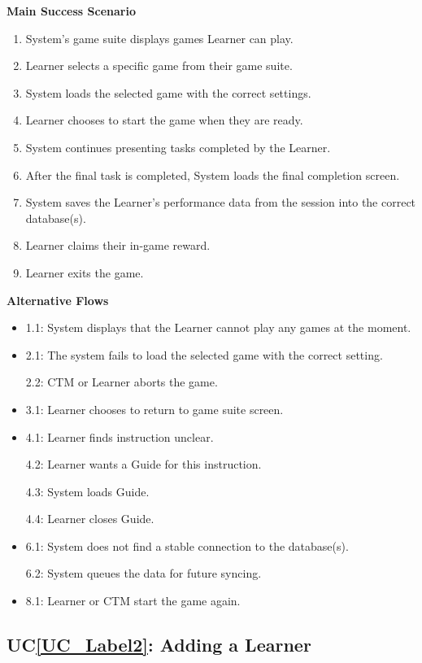 \documentclass[12pt]{article}
\newcounter{ucnum} %
\newcommand{\ucref}[1]{UC\ref{#1}}
\begin{document}
\textbf{Main Success Scenario}
\begin{enumerate}
\item System's game suite displays games Learner can play.
\item Learner selects a specific game from their game suite.
\item System loads the selected game with the correct settings. 
\item Learner chooses to start the game when they are ready.
\item System continues presenting tasks completed by the Learner.
\item After the final task is completed, System loads the final completion screen.
\item System saves the Learner's performance data from the session into the correct database(s).
\item Learner claims their in-game reward.
\item Learner exits the game.
\end{enumerate}

\textbf{Alternative Flows}
\begin{itemize}
\item 1.1: System displays that the Learner cannot play any games at the moment.

\item 2.1: The system fails to load the selected game with the correct setting.

2.2: CTM or Learner aborts the game.

\item 3.1: Learner chooses to return to game suite screen.

\item 4.1: Learner finds instruction unclear. 

4.2: Learner wants a Guide for this instruction.

4.3: System loads Guide.

4.4: Learner closes Guide.

\item 6.1: System does not find a stable connection to the database(s).

6.2: System queues the data for future syncing.

\item 8.1: Learner or CTM start the game again.

\end{itemize}

 \label{UC_Label2}
\subsection{\ucref{UC_Label2}: Adding a Learner}
\end{document}
